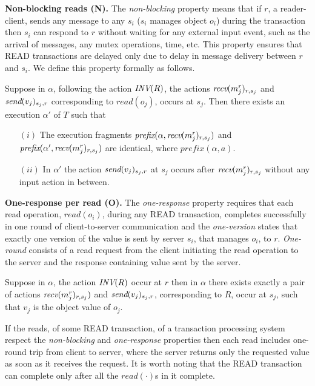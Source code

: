 {\bf Non-blocking reads (N).} The \emph{non-blocking} property means that if $r$, a reader-client,  sends any message to any $s_i$ ($s_i$ manages object $o_i$) during the transaction then  $s_i$ can  respond to  $r$ without waiting for any external input event, such as the arrival of messages, any mutex operations, time, etc. This property ensures that {\sc READ} transactions are delayed only due to delay in message delivery between $r$ and $s_i$. We define this property formally as follows.

\begin{definition}[Non-blocking read (N)]
 Suppose in  $\alpha$, following the action ${\textit{INV}(R)}$,  the actions  ${\textit{recv}(m_j^{r})_{r, s_j}}$ and   ${\textit{send}(v_j)_{ s_j, r}}$
   corresponding to $read(o_j)$, occurs at $s_j$.  Then there  exists an execution $\alpha'$ of $T$ such that
  \begin{enumerate}
  \item[ $(i)$ ] The execution fragments 
 $\textit{prefix}( \alpha, {\textit{recv}(m_j^{r})_{r, s_j}})$ and $\textit{prefix}( \alpha', {\textit{recv}(m_j^{r})_{r, s_j}})$ are identical, where
 $\textit{prefix}(\alpha, a)$.
 \item [ $(ii)$] In $\alpha'$ the action  ${\textit{send}(v_j)_{ s_j, r}}$ at $s_j$ occurs after ${\textit{recv}(m_j^{r})_{r, s_j}}$ without any input action in between.
\end{enumerate}
\end{definition}
  
{\bf One-response per read (O).} The \emph{one-response} property requires that each read operation, $read(o_i)$,  during any
READ transaction, completes successfully in one round of client-to-server communication and the \emph{one-version}  states that exactly one version of the value is sent by server $s_i$, that manages $o_i$, to $r$. \emph{One-round} consists of 
a read  request from the client initiating the read operation to the server  and  the response containing value sent by the server.

\begin{definition}[One response per read (O)]
 Suppose in  $\alpha$, the action ${\textit{INV}(R)}$ occur at $r$  then in $\alpha$ there exists  exactly a pair of actions $ {\textit{recv}(m_j^{r})_{r, s_j}})$ and   ${\textit{send}(v_j)_{ s_j, r}}$, corresponding to $R$,  occur at $s_j$, such that 
 $v_j$ is the object value of $o_j$.
\end{definition}
If the reads,  of some READ transaction, of a transaction processing system respect the \emph{non-blocking} and \emph{one-response} properties then each read includes one-round trip from client to server,  where the server returns only the requested value as soon as it receives the request. It is worth noting that the READ transaction can complete only after all the $read(\cdot)$s in it complete.

